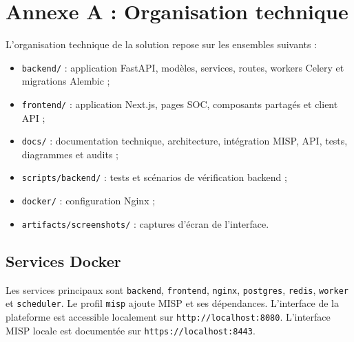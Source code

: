 \chapter{Annexe A : Organisation technique}

L'organisation technique de la solution repose sur les ensembles suivants :

\begin{itemize}[leftmargin=1.2cm]
    \item \texttt{backend/} : application FastAPI, modèles, services, routes, workers Celery et migrations Alembic ;
    \item \texttt{frontend/} : application Next.js, pages SOC, composants partagés et client API ;
    \item \texttt{docs/} : documentation technique, architecture, intégration MISP, API, tests, diagrammes et audits ;
    \item \texttt{scripts/backend/} : tests et scénarios de vérification backend ;
    \item \texttt{docker/} : configuration Nginx ;
    \item \texttt{artifacts/screenshots/} : captures d'écran de l'interface.
\end{itemize}

\section*{Services Docker}

Les services principaux sont \texttt{backend}, \texttt{frontend}, \texttt{nginx}, \texttt{postgres}, \texttt{redis}, \texttt{worker} et \texttt{scheduler}. Le profil \texttt{misp} ajoute MISP et ses dépendances. L'interface de la plateforme est accessible localement sur \texttt{http://localhost:8080}. L'interface MISP locale est documentée sur \texttt{https://localhost:8443}.
